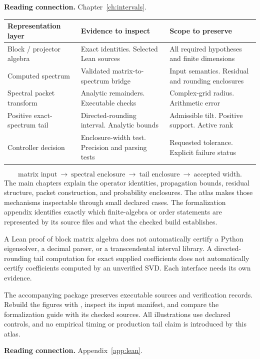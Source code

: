\vfill{\footnotesize\color{navy}\textbf{Reading connection.} Chapter~\ref{ch:intervals}.}
\clearpage
{}
\vspace{3pt}
\vspace{5pt}\begin{center}\small\renewcommand{\arraystretch}{1.3}\begin{tabular}{@{}>{\raggedright\arraybackslash}P{.25\linewidth}>{\raggedright\arraybackslash}P{.33\linewidth}>{\raggedright\arraybackslash}P{.36\linewidth}@{}}\toprule
Representation layer & Evidence to inspect & Scope to preserve\\
\midrule
Block / projector algebra & Exact identities. Selected Lean sources & All required hypotheses and finite dimensions\\
Computed spectrum & Validated matrix-to-spectrum bridge & Input semantics. Residual and rounding enclosures\\
Spectral packet transform & Analytic remainders. Executable checks & Complex-grid radius. Arithmetic error\\
Positive exact-spectrum tail & Directed-rounding interval. Analytic bounds & Admissible tilt. Positive support. Active rank\\
Controller decision & Enclosure-width test. Precision and parsing tests & Requested tolerance. Explicit failure status\\
\bottomrule\end{tabular}\end{center}
\[\text{matrix input}\ \longrightarrow\ \text{spectral enclosure}\ \longrightarrow\ \text{tail enclosure}\ \longrightarrow\ \text{accepted width}.\]
The main chapters explain the operator identities, propagation bounds, residual structure, packet construction, and probability enclosures. The atlas makes those mechanisms inspectable through small declared cases. The formalization appendix identifies exactly which finite-algebra or order statements are represented by its source files and what the checked build establishes.

A Lean proof of block matrix algebra does not automatically certify a Python eigensolver, a decimal parser, or a transcendental interval library. A directed-rounding tail computation for exact supplied coefficients does not automatically certify coefficients computed by an unverified SVD. Each interface needs its own evidence.

The accompanying package preserves executable sources and verification records. Rebuild the figures with , inspect its input manifest, and compare the formalization guide with its checked sources. All illustrations use declared controls, and no empirical timing or production tail claim is introduced by this atlas.

\vfill{\footnotesize\color{navy}\textbf{Reading connection.} Appendix~\ref{app:lean}.}

\endgroup
